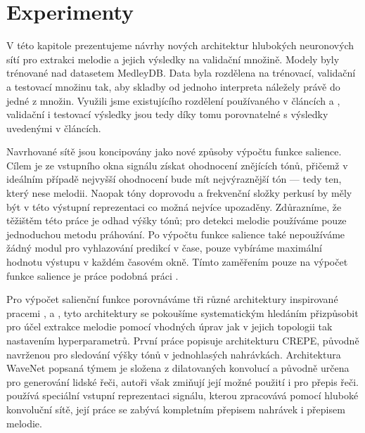\chapter{Experimenty}\label{cha:experimenty}

V této kapitole prezentujeme návrhy nových architektur hlubokých neuronových sítí pro extrakci melodie a jejich výsledky na validační množině. Modely byly trénované nad datasetem MedleyDB. Data byla rozdělena na trénovací, validační a testovací množinu tak, aby skladby od jednoho interpreta náležely právě do jedné z množin. Využili jsme existujícího rozdělení používaného v článcích \cite{Bittner2017} a \cite{DBasaranSEssid2018}, validační i testovací výsledky jsou tedy díky tomu porovnatelné s výsledky uvedenými v článcích.

Navrhované sítě jsou koncipovány jako nové způsoby výpočtu funkce salience. Cílem je ze vstupního okna signálu získat ohodnocení znějících tónů, přičemž v ideálním případě nejvyšší ohodnocení bude mít nejvýraznější tón --- tedy ten, který nese melodii. Naopak tóny doprovodu a frekvenční složky perkusí by měly být v této výstupní reprezentaci co možná nejvíce upozaděny. Zdůrazníme, že těžištěm této práce je odhad výšky tónů; pro detekci melodie používáme pouze jednoduchou metodu práhování. Po výpočtu funkce salience také nepoužíváme žádný modul pro vyhlazování predikcí v čase, pouze vybíráme maximální hodnotu výstupu v každém časovém okně. Tímto zaměřením pouze na výpočet funkce salience je práce podobná práci \cite{Bittner2017}.

Pro výpočet salienční funkce porovnáváme tři různé architektury inspirované pracemi \cite{Kim2018}, \cite{Oord2016} a \cite{Bittner2017}, tyto architektury se pokoušíme systematickým hledáním přizpůsobit pro účel extrakce melodie pomocí vhodných úprav jak v jejich topologii tak nastavením hyperparametrů. První práce popisuje architekturu CREPE, původně navrženou pro sledování výšky tónů v jednohlasých nahrávkách. Architektura WaveNet popsaná týmem \cite{Oord2016} je složena z dilatovaných konvolucí a původně určena pro generování lidské řeči, autoři však zmiňují její možné použití i pro přepis řeči. \cite{Bittner2017} používá speciální vstupní reprezentaci signálu, kterou zpracovává pomocí hluboké konvoluční sítě, její práce se zabývá kompletním přepisem nahrávek i přepisem melodie. 


